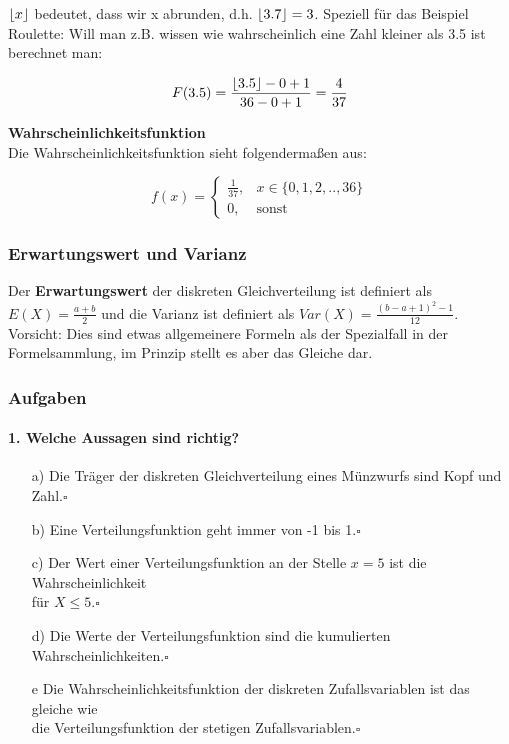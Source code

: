 \documentclass[a4paper]{article}
\DeclarePairedDelimiter\floor{\lfloor}{\rfloor}
\begin{document}
\noindent $\floor*{x}$ bedeutet, dass wir x abrunden, d.h. $\floor{3.7} = 3$. Speziell für das Beispiel Roulette: Will man z.B. wissen wie wahrscheinlich eine Zahl kleiner als 3.5 ist berechnet man:

\begin{equation*}
    F(3.5) = \frac{\floor*{3.5}-0+1}{36-0+1} = \frac{4}{37}
\end{equation*}


\noindent \textbf{Wahrscheinlichkeitsfunktion}\\
Die Wahrscheinlichkeitsfunktion sieht folgendermaßen aus:

\begin{equation*}
    f(x)=\begin{cases}
			\frac{1}{37}, & \text{$x \in \{0,1,2,..,36\}$}\\
            0, & \text{sonst}
		 \end{cases}
\end{equation*}


\subsubsection{Erwartungswert und Varianz} \label{sec:Expec}
Der \textbf{Erwartungswert} der diskreten Gleichverteilung ist definiert als $E(X) = \frac{a+b}{2}$ und die Varianz ist definiert als $Var(X) = \frac{(b-a+1)^2-1}{12}$. Vorsicht: Dies sind etwas allgemeinere Formeln als der Spezialfall in der Formelsammlung, im Prinzip stellt es aber das Gleiche dar.

\clearpage
\subsubsection{Aufgaben}
\paragraph{1. Welche Aussagen sind richtig?}
\begin{itemize}
    \item[a)]Die Träger der diskreten Gleichverteilung eines Münzwurfs sind Kopf und Zahl.\hfill $\square$
    \item[b)]Eine Verteilungsfunktion geht immer von -1 bis 1.\hfill $\square$
    \item[c)]Der Wert einer Verteilungsfunktion an der Stelle $x=5$ ist die Wahrscheinlichkeit \\für $X\leq 5$.\hfill $\square$
    \item[d)]Die Werte der Verteilungsfunktion sind die kumulierten Wahrscheinlichkeiten.\hfill $\square$
    \item[e]Die Wahrscheinlichkeitsfunktion der diskreten Zufallsvariablen ist das gleiche wie \\die Verteilungsfunktion der stetigen Zufallsvariablen.\hfill $\square$
\end{itemize}
\end{document}
